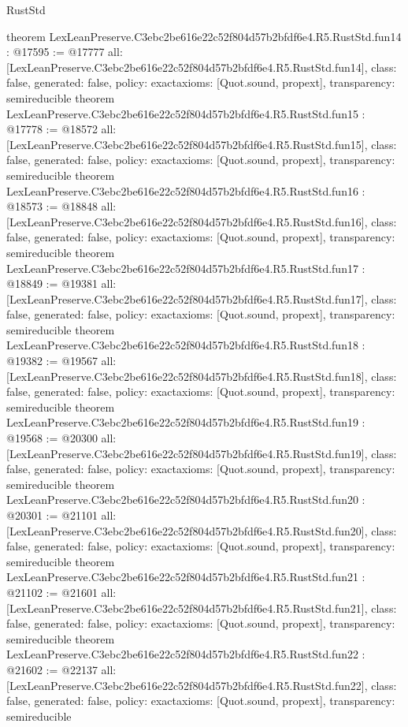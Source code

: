 \begin{lexlean}{RustStd}
\begin{coremodule}
{}
theorem LexLeanPreserve.C3ebc2be616e22c52f804d57b2bfdf6e4.R5.RustStd.fun14 : @17595 := @17777 {
  all: [LexLeanPreserve.C3ebc2be616e22c52f804d57b2bfdf6e4.R5.RustStd.fun14],
  class: false,
  generated: false,
  policy: exact{axioms: [Quot.sound, propext]},
  transparency: semireducible
}
theorem LexLeanPreserve.C3ebc2be616e22c52f804d57b2bfdf6e4.R5.RustStd.fun15 : @17778 := @18572 {
  all: [LexLeanPreserve.C3ebc2be616e22c52f804d57b2bfdf6e4.R5.RustStd.fun15],
  class: false,
  generated: false,
  policy: exact{axioms: [Quot.sound, propext]},
  transparency: semireducible
}
theorem LexLeanPreserve.C3ebc2be616e22c52f804d57b2bfdf6e4.R5.RustStd.fun16 : @18573 := @18848 {
  all: [LexLeanPreserve.C3ebc2be616e22c52f804d57b2bfdf6e4.R5.RustStd.fun16],
  class: false,
  generated: false,
  policy: exact{axioms: [Quot.sound, propext]},
  transparency: semireducible
}
theorem LexLeanPreserve.C3ebc2be616e22c52f804d57b2bfdf6e4.R5.RustStd.fun17 : @18849 := @19381 {
  all: [LexLeanPreserve.C3ebc2be616e22c52f804d57b2bfdf6e4.R5.RustStd.fun17],
  class: false,
  generated: false,
  policy: exact{axioms: [Quot.sound, propext]},
  transparency: semireducible
}
theorem LexLeanPreserve.C3ebc2be616e22c52f804d57b2bfdf6e4.R5.RustStd.fun18 : @19382 := @19567 {
  all: [LexLeanPreserve.C3ebc2be616e22c52f804d57b2bfdf6e4.R5.RustStd.fun18],
  class: false,
  generated: false,
  policy: exact{axioms: [Quot.sound, propext]},
  transparency: semireducible
}
theorem LexLeanPreserve.C3ebc2be616e22c52f804d57b2bfdf6e4.R5.RustStd.fun19 : @19568 := @20300 {
  all: [LexLeanPreserve.C3ebc2be616e22c52f804d57b2bfdf6e4.R5.RustStd.fun19],
  class: false,
  generated: false,
  policy: exact{axioms: [Quot.sound, propext]},
  transparency: semireducible
}
theorem LexLeanPreserve.C3ebc2be616e22c52f804d57b2bfdf6e4.R5.RustStd.fun20 : @20301 := @21101 {
  all: [LexLeanPreserve.C3ebc2be616e22c52f804d57b2bfdf6e4.R5.RustStd.fun20],
  class: false,
  generated: false,
  policy: exact{axioms: [Quot.sound, propext]},
  transparency: semireducible
}
theorem LexLeanPreserve.C3ebc2be616e22c52f804d57b2bfdf6e4.R5.RustStd.fun21 : @21102 := @21601 {
  all: [LexLeanPreserve.C3ebc2be616e22c52f804d57b2bfdf6e4.R5.RustStd.fun21],
  class: false,
  generated: false,
  policy: exact{axioms: [Quot.sound, propext]},
  transparency: semireducible
}
theorem LexLeanPreserve.C3ebc2be616e22c52f804d57b2bfdf6e4.R5.RustStd.fun22 : @21602 := @22137 {
  all: [LexLeanPreserve.C3ebc2be616e22c52f804d57b2bfdf6e4.R5.RustStd.fun22],
  class: false,
  generated: false,
  policy: exact{axioms: [Quot.sound, propext]},
  transparency: semireducible
}
\end{coremodule}
\end{lexlean}
